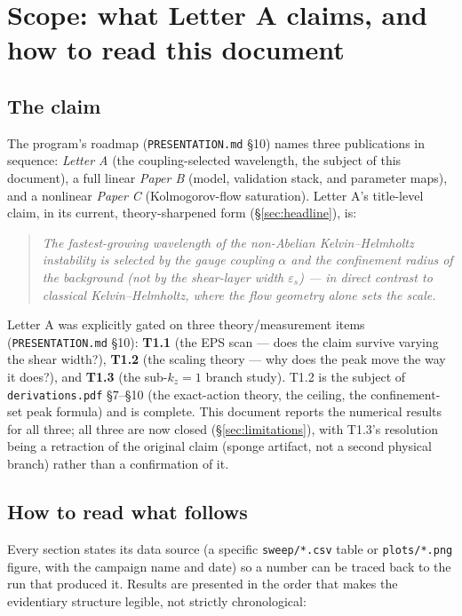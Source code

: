 \documentclass[11pt,a4paper]{article}
\numberwithin{equation}{section}
\theoremstyle{remark}
\newcommand{\eps}{\varepsilon_s}
\newcommand{\kz}{k_z}
\begin{document}
\tableofcontents
{\small\listoffigures}
\clearpage

\section{Scope: what Letter A claims, and how to read this document}
\label{sec:scope}

\subsection{The claim}

The program's roadmap (\texttt{PRESENTATION.md} \S10) names three
publications in sequence: \emph{Letter A} (the coupling-selected
wavelength, the subject of this document), a full linear \emph{Paper B}
(model, validation stack, and parameter maps), and a nonlinear
\emph{Paper C} (Kolmogorov-flow saturation). Letter A's title-level claim,
in its current, theory-sharpened form (\S\ref{sec:headline}), is:

\begin{quote}
\emph{The fastest-growing wavelength of the non-Abelian Kelvin--Helmholtz
instability is selected by the gauge coupling $\alpha$ and the
confinement radius of the background (not by the shear-layer width
$\eps$) — in direct contrast to classical Kelvin--Helmholtz, where the
flow geometry alone sets the scale.}
\end{quote}

Letter A was explicitly gated on three theory/measurement items
(\texttt{PRESENTATION.md} \S10): \textbf{T1.1} (the EPS scan — does the
claim survive varying the shear width?), \textbf{T1.2} (the scaling
theory — why does the peak move the way it does?), and \textbf{T1.3} (the
sub-$\kz=1$ branch study). T1.2 is the subject of \texttt{derivations.pdf}
\S7--\S10 (the exact-action theory, the ceiling, the confinement-set peak
formula) and is complete. This document reports the numerical results for
all three; all three are now closed (\S\ref{sec:limitations}), with T1.3's
resolution being a retraction of the original claim (sponge artifact, not a
second physical branch) rather than a confirmation of it.

\subsection{How to read what follows}

Every section states its data source (a specific \texttt{sweep/*.csv} table
or \texttt{plots/*.png} figure, with the campaign name and date) so a
number can be traced back to the run that produced it. Results are
presented in the order that makes the evidentiary structure legible, not
strictly chronological:
\end{document}
